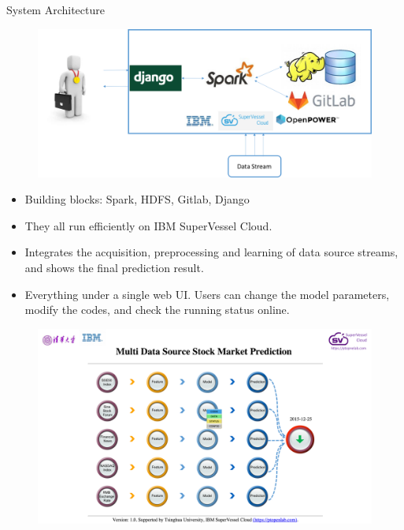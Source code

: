 \documentclass[final,hyperref={pdfpagelabels=false}]{beamer}
\begin{document}
\begin{frame}[t]
\begin{columns}[t]
\begin{column}{.445\textwidth}




\begin{block}{System Architecture}
	\begin{figure}
		\includegraphics[width=0.7\linewidth]{system.png}
	\end{figure}
\begin{itemize}
\item Building blocks: Spark, HDFS, Gitlab, Django
\item They all run efficiently on IBM SuperVessel Cloud. 
\item Integrates the acquisition, preprocessing and learning of data source streams, and shows the final prediction result. 
\item Everything under a single web UI. Users can change the model parameters, modify the codes, and check the running status online.

\end{itemize}

\begin{figure}
		\includegraphics[width=0.5\linewidth]{webui.png}
	\end{figure}

\end{block}


\end{column}
\end{columns}
\end{frame}
\end{document}
